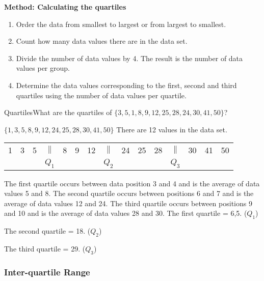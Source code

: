 \documentclass[10pt,a4paper,titlepage,twoside,openright]{report}
\begin{document}
\textbf{Method: Calculating the quartiles}
\begin{enumerate}
\item Order the data from smallest to largest or from largest to smallest.
\item Count how many data values there are in the data set.
\item Divide the number of data values by 4. The result is the number of data values per group.
\item Determine the data values corresponding to the first, second and third quartiles using the number of data values per quartile.
\end{enumerate}

\begin{wex}{Quartiles}{What are the quartiles of $\{3,5,1,8,9,12,25,28,24,30,41,50\}$?}{
$\{1, 3, 5, 8, 9, 12, 24, 25, 28, 30, 41, 50\}$
There are 12 values in the data set.
\begin{center}
\begin{tabular}{c c c c c c c c c c c c c c c}
1 & 3 & 5 & $\|$ & 8 & 9 & 12 & $\|$ & 24 & 25 & 28 & $\|$ & 30 & 41 & 50 \\
 & & & $Q_1$ & & & & $Q_2$ & & & & $Q_3$ & & & \\
\end{tabular}
\end{center}
The first quartile occurs between data position 3 and 4 and is the average of data values 5 and 8. The second quartile occurs between positions 6 and 7 and is the average of data values 12 and 24. The third quartile occurs between positions 9 and 10 and is the average of data values 28 and 30.
The first quartile = 6,5. ($Q_1$) \par The second quartile = 18. ($Q_2$) \par The third quartile = 29. ($Q_3$)}
\end{wex}

\subsubsection{Inter-quartile Range}
\end{document}
